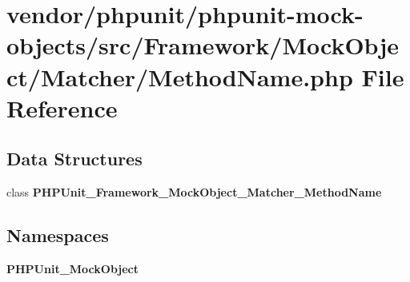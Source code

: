 \section{vendor/phpunit/phpunit-\/mock-\/objects/src/\+Framework/\+Mock\+Object/\+Matcher/\+Method\+Name.php File Reference}
\label{_method_name_8php}
\subsection*{Data Structures}
\begin{DoxyCompactItemize}
\item 
class {\bf P\+H\+P\+Unit\+\_\+\+Framework\+\_\+\+Mock\+Object\+\_\+\+Matcher\+\_\+\+Method\+Name}
\end{DoxyCompactItemize}
\subsection*{Namespaces}
\begin{DoxyCompactItemize}
\item 
 {\bf P\+H\+P\+Unit\+\_\+\+Mock\+Object}
\end{DoxyCompactItemize}
